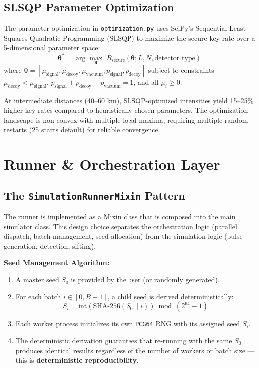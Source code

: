\documentclass[11pt,a4paper,oneside]{report}
\begin{document}
\subsection{SLSQP Parameter Optimization}

The parameter optimization in \texttt{optimization.py} uses SciPy's Sequential Least Squares Quadratic Programming (SLSQP) to maximize the secure key rate over a 5-dimensional parameter space:
\begin{equation}
\boldsymbol{\theta}^* = \arg\max_{\boldsymbol{\theta}} \; R_{\text{secure}}(\boldsymbol{\theta}; L, N, \text{detector\_type})
\end{equation}
where $\boldsymbol{\theta} = [\mu_{\text{signal}}, \mu_{\text{decoy}}, \mu_{\text{vacuum}}, p_{\text{signal}}, p_{\text{decoy}}]$ subject to constraints $\mu_{\text{decoy}} < \mu_{\text{signal}}$, $p_{\text{signal}} + p_{\text{decoy}} + p_{\text{vacuum}} = 1$, and all $\mu_i \geq 0$.

At intermediate distances (40–60 km), SLSQP-optimized intensities yield 15–25\% higher key rates compared to heuristically chosen parameters. The optimization landscape is non-convex with multiple local maxima, requiring multiple random restarts (25 starts default) for reliable convergence.

\section{Runner \& Orchestration Layer}

\subsection{The \texttt{SimulationRunnerMixin} Pattern}

The runner is implemented as a Mixin class that is composed into the main simulator class. This design choice separates the orchestration logic (parallel dispatch, batch management, seed allocation) from the simulation logic (pulse generation, detection, sifting).

\textbf{Seed Management Algorithm:}
\begin{enumerate}
\item A master seed $S_0$ is provided by the user (or randomly generated).
\item For each batch $i \in [0, B-1]$, a child seed is derived deterministically:
  \begin{equation}
  S_i = \text{int}(\text{SHA-256}(S_0 \| i)) \bmod (2^{64} - 1)
  \end{equation}
\item Each worker process initializes its own \texttt{PCG64} RNG with its assigned seed $S_i$.
\item The deterministic derivation guarantees that re-running with the same $S_0$ produces identical results regardless of the number of workers or batch size — this is \textbf{deterministic reproducibility}.
\end{enumerate}
\end{document}

